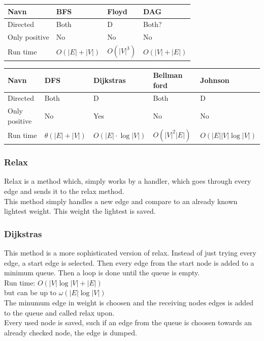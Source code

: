 \documentclass[12pt, a4paper]{article}
\begin{document}
		\begin{table}[h!]
				  \begin{tabular}{|l|l|l|l|}
							 \hline
							 Navn &  BFS  & Floyd & DAG \\ \hline
							 Directed & Both & D & Both?\\ \hline
							 Only positive & No & No & No\\ \hline
							 Run time & $O(|E|+|V|)$ &$O(|V|^3)$ & $O(|V|+|E|)$\\ \hline
				  \end{tabular}
		\end{table}
		\begin{table}[h!]
				  \begin{tabular}{|l|l|l|l|l|}
							 \hline
							 Navn & DFS & Dijkstras & Bellman ford & Johnson \\ \hline
							 Directed & Both & D & Both & D\\ \hline
							 Only positive & No & Yes & No & No\\ \hline
							 Run time & $\theta(|E|+|V|)$ & $O(|E|\cdot \log|V|)$ & $O(|V|^2|E|)$ & $O(|E||V|\log|V|)$\\ \hline
				  \end{tabular}
		\end{table}
			\subsubsection{Relax}
				Relax is a method which, simply works by a handler, which goes through every edge and sends it to the relax method.\\
				This method simply handles a new edge and compare to an already known lightest weight. This weight the lightest is saved.
			\subsubsection{Dijkstras}
				This method is a more sophisticated version of relax. Instead of just trying every edge, a start edge is selected. Then every edge from the start node is added to a minimum queue. Then a loop is done until the queue is empty.\\
				Run time: $O(|V|\log |V| + |E|)$\\ but can be up to $\omega(|E|\log |V|)$\\
				The minumum edge in weight is choosen and the receiving nodes edges is added to the queue and called relax upon.\\
				Every used node is saved, such if an edge from the queue is choosen towards an already checked node, the edge is dumped.\\
\end{document}
